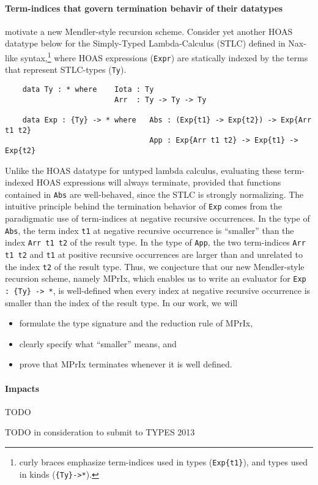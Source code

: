 \documentclass[a4paper]{easychair} %
\begin{document}
\paragraph{Term-indices that govern termination behavir of their datatypes\!\!}
motivate a new Mendler-style recursion scheme.
Consider yet another HOAS datatype below for the Simply-Typed Lambda-Calculus (STLC)
defined in Nax-like syntax,\footnote{curly braces emphasize
  term-indices used in types (\texttt{Exp\{t1\}}),
  and types used in kinds (\texttt{\{Ty\}\;->\;*}).}
where HOAS expressions (\texttt{Expr}) are
statically indexed by the terms that represent STLC-types (\texttt{Ty}).
\begin{verbatim}
    data Ty : * where    Iota : Ty
                         Arr  : Ty -> Ty -> Ty

    data Exp : {Ty} -> * where   Abs : (Exp{t1} -> Exp{t2}) -> Exp{Arr t1 t2}
                                 App : Exp{Arr t1 t2} -> Exp{t1} -> Exp{t2}
\end{verbatim}
Unlike the HOAS datatype for untyped lambda calculus, evaluating
these term-indexed HOAS expressions will always terminate,
provided that functions contained in \texttt{Abs} are well-behaved,
since the STLC is strongly normalizing.
The intuitive principle behind the termination behavior of \texttt{Exp}
comes from the paradigmatic use of term-indices at negative recursive occurrences.  
In the type of \texttt{Abs}, the term index \texttt{t1}
at negative recursive occurrence is ``smaller'' than the index
\texttt{Arr t1 t2} of the result type. In the type of \texttt{App},
the two term-indices \texttt{Arr t1 t2} and \texttt{t1} at positive recursive
occurrences are larger than and unrelated to the index \texttt{t2} of the result type.
Thus, we conjecture that our new Mendler-style recursion scheme, namely \textsf{MPrIx},
which enables us to write an evaluator for  \verb|Exp : {Ty} -> *|, 
is well-defined when every index at negative recursive occurrence is
smaller than the index of the result type.
In our work, we will \vspace*{-1ex}
\begin{itemize}
 \item formulate the type signature and the reduction rule of \textsf{MPrIx},
 \vspace*{-1ex}
 \item clearly specify what ``smaller'' means, and
 \vspace*{-1ex}
 \item prove that \textsf{MPrIx} terminates whenever it is well defined.
\end{itemize}

\paragraph{Impacts} TODO

TODO in consideration to submit to TYPES 2013

\end{document}
